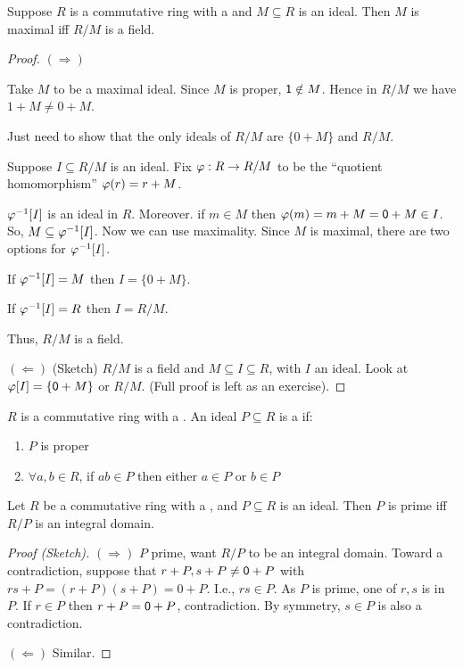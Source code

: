 \documentclass[notes.tex]{subfiles}
\begin{document}
\begin{proposition}
	Suppose $R$ is a commutative ring with a \one and $M\subseteq R$ is an ideal. Then $M$ is maximal iff $R/M$ is a field.
\end{proposition}
\begin{proof}
	$(\Longrightarrow)$
	
	Take $M$ to be a maximal ideal. Since $M$ is proper, $\mathsf{1}\notin M$. Hence in $R/M$ we have $1+M \ne 0+M$.

	Just need to show that the only ideals of $R/M$ are $\{0+M\}$ and $R/M$.

	Suppose $I\subseteq R/M$ is an ideal. Fix $\varphi:R\to R/M$ to be the ``quotient homomorphism'' $\varphi(r) = r+M$.

	${\varphi}^{-1}[I]$ is an ideal in $R$. Moreover. if $m\in M$ then $\varphi(m) = m+M = \mathsf{0} +M \in I$. So, $M\subseteq{\varphi}^{-1}[I]$. Now we can use maximality. Since $M$ is maximal, there are two options for ${\varphi}^{-1}[I]$.

	If ${\varphi}^{-1}[I] = M$ then $I = \{0+M\}$.

	If ${\varphi}^{-1}[I] = R$ then $I = R/M$.

	Thus, $R/M$ is a field.

	$(\Longleftarrow)$ (Sketch) $R/M$ is a field and $M\subseteq I \subseteq R$, with $I$  an ideal. Look at $\varphi[I] = \{\mathsf{0}+M\}$ or $R/M$. (Full proof is left as an exercise).
\end{proof}

\begin{defn}
	$R$ is a commutative ring with a \one. An ideal $P\subseteq R$ is a  if:
	\begin{enumerate}
		\item $P$ is proper
		\item $\forall a, b\in R$, if $ab\in P$ then either $a\in P$ or $b\in P$
	\end{enumerate}
\end{defn}

\begin{proposition}
	Let $R$ be a commutative ring with a \one, and $P\subseteq R$ is an ideal. Then $P$ is prime iff $R/P$ is an integral domain.
\end{proposition}
\begin{proof}[Proof (Sketch)]
	$(\Longrightarrow)$
	$P$ prime, want $R/P$ to be an integral domain.
	Toward a contradiction, suppose that $r+P, s+P\ne \mathsf{0} + P$ with $rs + P = (r+P)(s+P) = 0 + P$. I.e., $rs\in P$. As $P$ is prime, one of $r, s$ is in $P$. If $r\in P$ then $r+P = \mathsf{0} + P$, contradiction. By symmetry, $s\in P$ is also a contradiction.

	$(\Longleftarrow)$ Similar.
\end{proof}
\end{document}
